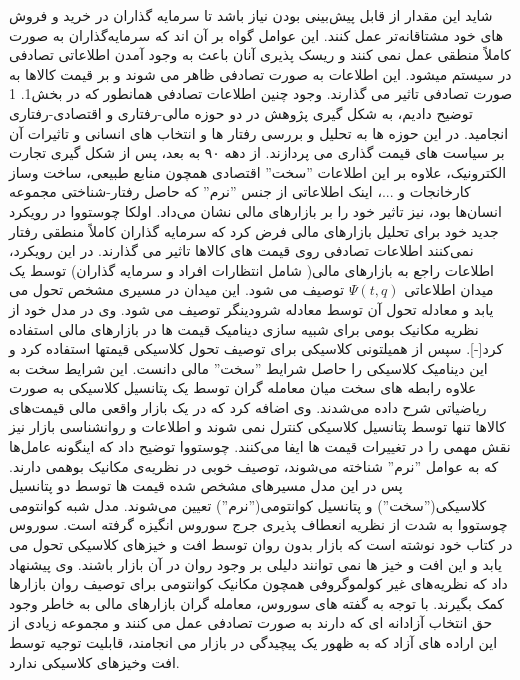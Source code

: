 \documentclass[a4paper,titlepage,12pt,fleqn,oneside]{report}
\begin{document}
  شاید این مقدار از قابل پیش‌بینی بودن نیاز باشد تا سرمایه گذاران در خرید و فروش های خود مشتاقانه‌تر عمل کنند.  این عوامل گواه بر آن اند که سرمایه‌گذاران به صورت کاملاً منطقی عمل نمی کنند و ریسک پذیری آنان باعث به وجود آمدن اطلاعاتی تصادفی در سیستم میشود.  این اطلاعات به صورت تصادفی ظاهر می شوند و بر قیمت کالاها به صورت تصادفی تاثیر می گذارند.  وجود چنین اطلاعات تصادفی  همانطور که در بخش1. 1 توضیح دادیم، به شکل گیری پژوهش در دو حوزه مالی-رفتاری و اقتصادی-رفتاری انجامید. در این حوزه ها به تحلیل و بررسی رفتار ها و انتخاب های انسانی و تاثیرات آن بر سیاست های قیمت گذاری می پردازند. از دهه ۹۰ به بعد، پس از شکل گیری تجارت الکترونیک، علاوه بر این اطلاعات ''سخت'' اقتصادی همچون منابع  طبیعی، ساخت وساز کارخانجات و ...، اینک اطلاعاتی از جنس ''نرم'' که حاصل رفتار-شناختی مجموعه انسان‌ها بود،  نیز تاثیر خود را بر بازارهای مالی نشان می‌داد.  اولکا چوستووا در رویکرد جدید خود برای تحلیل بازارهای مالی فرض کرد که سرمایه گذاران کاملاً منطقی رفتار نمی‌کنند اطلاعات تصادفی روی قیمت های کالاها تاثیر می گذارند.  در این رویکرد،  اطلاعات راجع به بازارهای مالی( شامل انتظارات افراد و سرمایه گذاران)  توسط یک میدان اطلاعاتی $\Psi(t,q)$  توصیف می شود.  این میدان در مسیری مشخص تحول می یابد و معادله تحول آن توسط معادله شرودینگر توصیف می شود.  وی در مدل خود از نظریه مکانیک بومی برای  شبیه سازی دینامیک قیمت ها در بازارهای مالی استفاده کرد[-].  سپس از همیلتونی کلاسیکی برای توصیف تحول کلاسیکی قیمتها استفاده کرد و  این دینامیک کلاسیکی را حاصل شرایط ''سخت'' مالی دانست.  این شرایط سخت به علاوه رابطه های سخت میان معامله گران توسط یک پتانسیل کلاسیکی به صورت ریاضیاتی شرح داده می‌شدند.  وی اضافه کرد که در یک بازار واقعی مالی قیمت‌های کالاها تنها توسط پتانسیل کلاسیکی کنترل نمی شوند و اطلاعات و روانشناسی بازار نیز نقش مهمی را در تغییرات قیمت ها ایفا می‌کنند. چوستووا  توضیح داد که اینگونه عامل‌ها که به عوامل ''نرم'' شناخته می‌شوند، توصیف خوبی در نظریه‌ی مکانیک بوهمی ‌دارند.  پس در این مدل مسیرهای مشخص شده قیمت ها توسط دو پتانسیل کلاسیکی(''سخت'')  و پتانسیل کوانتومی(''نرم'') تعیین می‌شوند.  مدل شبه کوانتومی چوستووا به شدت از نظریه انعطاف پذیری جرج سوروس انگیزه گرفته است. سوروس در کتاب خود نوشته است که بازار بدون روان توسط افت و خیزهای کلاسیکی تحول می یابد و این افت و خیز ها نمی توانند دلیلی بر وجود روان در آن بازار باشند. وی  پیشنهاد داد که نظریه‌های غیر کولموگروفی همچون مکانیک کوانتومی برای توصیف روان بازارها کمک بگیرند.   با توجه به گفته های سوروس،  معامله گران بازارهای مالی به خاطر وجود حق انتخاب آزادانه ای که دارند به صورت تصادفی عمل می کنند  و مجموعه زیادی از این اراده های آزاد که به ظهور یک پیچیدگی در بازار می انجامند، قابلیت توجیه توسط افت وخیزهای کلاسیکی ندارد.  
  
\end{document}
